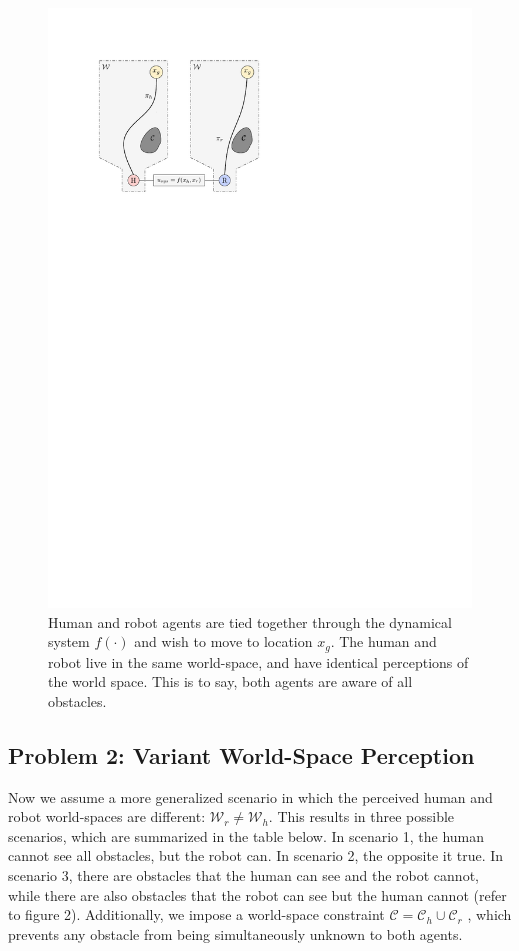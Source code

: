 \documentclass[conference]{IEEEtran}
\begin{document}
\begin{figure}[h!]
\begin{center}
\includegraphics{diag1.pdf}
  \caption{Human and robot agents are tied together through the dynamical system $f(\cdot)$ and wish to move to location $x_g$. The human and robot live in the same world-space, and have identical perceptions of the world space. This is to say, both agents are aware of all obstacles.}
\end{center}
\end{figure}
\subsection{Problem 2: Variant World-Space Perception}

\hspace{5mm}
Now we assume a more generalized scenario in which the perceived human and robot world-spaces are different: $\mathcal{W}_r \neq \mathcal{W}_h$. This results in three possible scenarios, which are summarized in the table below. In scenario 1, the human cannot see all obstacles, but the robot can. In scenario 2, the opposite it true. In scenario 3, there are obstacles that the human can see and the robot cannot, while there are also obstacles that the robot can see but the human cannot (refer to figure 2). Additionally, we impose a world-space constraint $\mathcal{C} = \mathcal{C}_h \cup \mathcal{C}_r$ , which prevents any obstacle from being simultaneously unknown to both agents. \\
\end{document}
